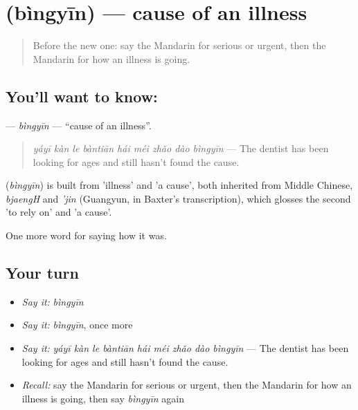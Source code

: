 \section[\texorpdfstring{\zh{病因} (bìngyīn)}{病因 (bìngyīn)}]{ (bìngyīn) — cause of an illness}

\label{lesson:ZH-C481-bingyin}



\begin{quote}
Before the new one: say the Mandarin for serious or urgent, then the Mandarin for how an illness is going.
\end{quote}

\subsection*{You'll want to know: }
\textbf{} — \emph{bìngyīn} — \textquotedblleft{}cause of an illness\textquotedblright{}.

\begin{quote}
\textbf{} \emph{yáyī kàn le bàntiān hái méi zhǎo dào bìngyīn} — The dentist has been looking for ages and still hasn't found the cause.
\end{quote}

\begin{cousinweb}
\textbf{} (\emph{bìngyīn}) is built from  'illness' and  'a cause', both inherited from Middle Chinese, \emph{bjaengH} and \emph{'jin} (Guangyun, in Baxter's transcription), which glosses the second 'to rely on' and 'a cause'.
\end{cousinweb}

\begin{grammarlens}[title={What you've built}]
One more word for saying how it was.
\end{grammarlens}

\subsection*{Your turn}
\begin{itemize}
\raggedright
  \item \emph{Say it:} \emph{bìngyīn}
  \item \emph{Say it:} \emph{bìngyīn}, once more
  \item \emph{Say it:} \emph{yáyī kàn le bàntiān hái méi zhǎo dào bìngyīn} — The dentist has been looking for ages and still hasn't found the cause.
  \item \emph{Recall:} say the Mandarin for serious or urgent, then the Mandarin for how an illness is going, then say \emph{bìngyīn} again
\end{itemize}

